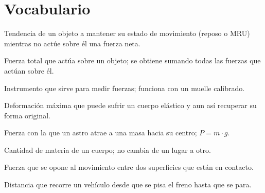 \section{Vocabulario}

\begin{vocabulary}
    Tendencia de un objeto a mantener su estado de movimiento (reposo o MRU) mientras no actúe sobre él una fuerza neta.
\end{vocabulary}

\begin{vocabulary}
    Fuerza total que actúa sobre un objeto; se obtiene sumando todas las fuerzas que actúan sobre él.
\end{vocabulary}

\begin{vocabulary}
    Instrumento que sirve para medir fuerzas; funciona con un muelle calibrado.
\end{vocabulary}

\begin{vocabulary}
    Deformación máxima que puede sufrir un cuerpo elástico y aun así recuperar su forma original.
\end{vocabulary}

\begin{vocabulary}
    Fuerza con la que un astro atrae a una masa hacia su centro; \(P = m \cdot g\).
\end{vocabulary}

\begin{vocabulary}
    Cantidad de materia de un cuerpo; no cambia de un lugar a otro.
\end{vocabulary}

\begin{vocabulary}
    Fuerza que se opone al movimiento entre dos superficies que están en contacto.
\end{vocabulary}

\begin{vocabulary}
    Distancia que recorre un vehículo desde que se pisa el freno hasta que se para.
\end{vocabulary}
